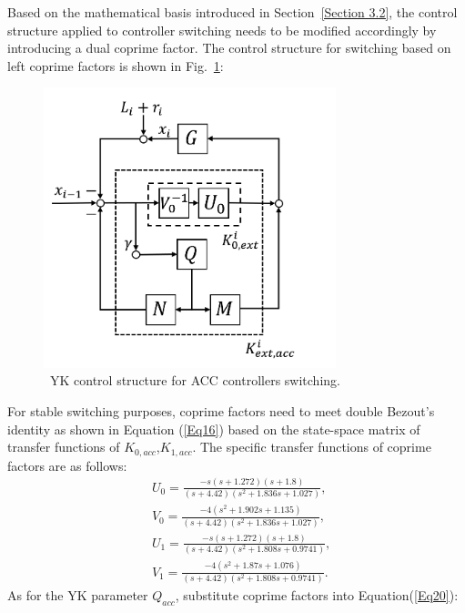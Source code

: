 \documentclass[journal]{IEEEtran}
\begin{document}
Based on the mathematical basis introduced in Section~\ref{Section 3.2}, the control structure applied to controller switching needs to be modified accordingly by introducing a dual coprime factor. The control structure for switching based on left coprime factors is shown in Fig.~\ref{fig6}:

\begin{figure}
  \centering
  \includegraphics[width=8.5cm]{figs/fig6.png}
  \caption{~YK control structure for ACC controllers switching.}
  \label{fig6}
\end{figure}
For stable switching purposes, coprime factors need to meet double Bezout's identity as shown in Equation (\ref{Eq16}) based on the state-space matrix of transfer functions of $K_{0,acc}$,$K_{1,acc}$. The specific transfer functions of coprime factors are as follows:
\begin{equation}
  \begin{aligned}
     & U_{0}=\frac{-s(s+1.272)(s+1.8)}{(s+4.42)\left(s^{2}+1.836 s+1.027\right)},                 \\
     & V_{0}=\frac{-4\left(s^{2}+1.902 s+1.135\right)}{(s+4.42)\left(s^{2}+1.836 s+1.027\right)}, \\
     & U_{1}=\frac{-s(s+1.272)(s+1.8)}{(s+4.42)\left(s^{2}+1.808 s+0.9741\right)},                \\
     & V_{1}=\frac{-4\left(s^{2}+1.87 s+1.076\right)}{(s+4.42)\left(s^{2}+1.808 s+0.9741\right)}.
  \end{aligned}
\end{equation}
As for the YK parameter $Q_{acc}$, substitute coprime factors into Equation(\ref{Eq20}):
\end{document}
